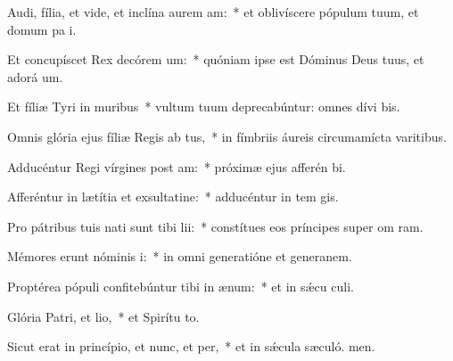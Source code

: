 \item Audi, fília, et vide, et inclína aurem am:~* et oblivíscere pópulum tuum, et domum pa i.
\item Et concupíscet Rex decórem um:~* quóniam ipse est Dóminus Deus tuus, et adorá um.
\item Et fíliæ Tyri in muribus~* vultum tuum deprecabúntur: omnes dívi bis.
\item Omnis glória ejus fíliæ Regis ab tus,~* in fímbriis áureis circumamícta varitibus.
\item Adducéntur Regi vírgines post am:~* próximæ ejus afferén bi.
\item Afferéntur in lætítia et exsultatine:~* adducéntur in tem gis.
\item Pro pátribus tuis nati sunt tibi lii:~* constítues eos príncipes super om ram.
\item Mémores erunt nóminis i:~* in omni generatióne et generanem.
\item Proptérea pópuli confitebúntur tibi in ænum:~* et in sǽcu culi.
\item Glória Patri, et lio,~* et Spirítu to.
\item Sicut erat in princípio, et nunc, et per,~* et in sǽcula sæculó. men.
